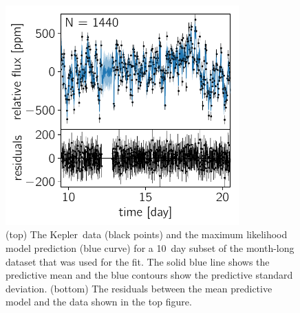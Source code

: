 \documentclass[manuscript, letterpaper]{aastex6}
\newcommand{\project}[1]{\textsf{#1}}
\newcommand{\kepler}{\project{Kepler}}
\newcommand{\figurelabel}[1]{\label{fig:#1}}
\newcommand{\response}[1]{{\color{blue}#1}}
\begin{document}


\begin{figure}[!htbp]
\begin{center}
\includegraphics[width=0.8\textwidth]{figures/astero/astero.pdf}
\caption{
\response{
(top) The \kepler\ data (black points) and the maximum likelihood model
    prediction (blue curve) for a 10~day subset of the month-long dataset that
    was used for the fit.
    The solid blue line shows the predictive mean and the blue contours show
    the predictive standard deviation.
(bottom) The residuals between the mean predictive model and the data
    shown in the top figure.
}
    \figurelabel{astero}}
\end{center}
\end{figure}
\end{document}
